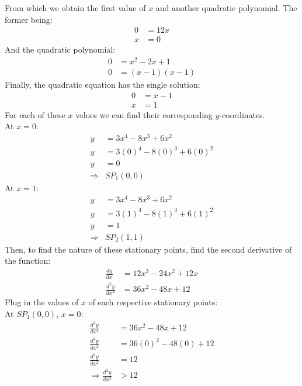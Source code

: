 \documentclass[hidelinks, a4paper, 12pt]{article}
\newcommand{\n}{\\[\baselineskip]}
\newcommand{\thus}{\Rightarrow}
\newcommand{\dydx}{\frac{dy}{dx}}
\newcommand{\dydxx}{\frac{d^2y}{dx^2}}
\begin{document}
                From which we obtain the first value of $x$ and another quadratic polynomial. The former being:
                \[\begin{split}
                    0 &= 12x\\
                    x &= 0
                \end{split}\]
                And the quadratic polynomial:
                \[\begin{split}
                    0 &= x^2 - 2x + 1\\
                    0 &= (x-1)(x-1)
                \end{split}\]
                Finally, the quadratic equation has the single solution:
                \[\begin{split}
                    0 &= x-1\\
                    x &= 1
                \end{split}\]
                For each of these $x$ values we can find their corresponding $y$-coordinates.\n
                At $x = 0$:
                \[\begin{split}
                    y &= 3x^4 - 8x^3 + 6x^2\\
                    y &= 3(0)^4 - 8(0)^3 + 6(0)^2\\
                    y &= 0\\
                    \thus &SP_1(0,0)
                \end{split}\]
                At $x = 1$:
                \[\begin{split}
                    y &= 3x^4 - 8x^3 + 6x^2\\
                    y &= 3(1)^4 - 8(1)^3 + 6(1)^2\\
                    y &= 1\\
                    \thus &SP_2(1,1)
                \end{split}\]
                Then, to find the nature of these stationary points, find the second derivative of the function:
                \[\begin{split}
                    \dydx &= 12x^3 - 24x^2 + 12x\\
                    \dydxx &= 36x^2 - 48x + 12
                \end{split}\]
                Plug in the values of $x$ of each respective stationary points:\n
                At $SP_1(0,0)$, $x=0$:
                \[\begin{split}
                    \dydxx &= 36x^2 - 48x + 12\\
                    \dydxx &= 36(0)^2 - 48(0) + 12\\
                    \dydxx &= 12\\
                    \thus \dydxx &> 12
                \end{split}\]
\end{document}
